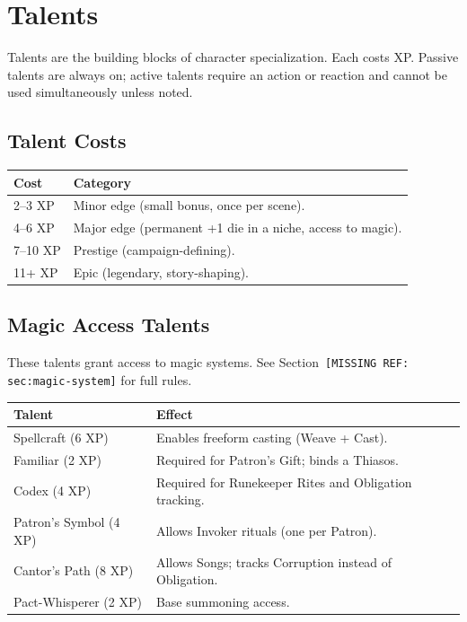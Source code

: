 
\section{Talents}

Talents are the building blocks of character specialization. Each costs XP. Passive talents are always on; active talents require an action or reaction and cannot be used simultaneously unless noted.

\subsection{Talent Costs}

\begin{tabular}{@{}ll@{}}
\toprule
\textbf{Cost} & \textbf{Category} \\
\midrule
2--3 XP & Minor edge (small bonus, once per scene). \\
4--6 XP & Major edge (permanent +1 die in a niche, access to magic). \\
7--10 XP & Prestige (campaign-defining). \\
11+ XP & Epic (legendary, story-shaping). \\
\bottomrule
\end{tabular}

\subsection{Magic Access Talents}

These talents grant access to magic systems. See Section~\texttt{[MISSING REF: sec:magic-system]} for full rules.

\begin{tabular}{@{}lp{10cm}@{}}
\toprule
\textbf{Talent} & \textbf{Effect} \\
\midrule
Spellcraft (6 XP) & Enables freeform casting (Weave + Cast). \\
Familiar (2 XP) & Required for Patron's Gift; binds a Thiasos. \\
Codex (4 XP) & Required for Runekeeper Rites and Obligation tracking. \\
Patron's Symbol (4 XP) & Allows Invoker rituals (one per Patron). \\
Cantor's Path (8 XP) & Allows Songs; tracks Corruption instead of Obligation. \\
Pact-Whisperer (2 XP) & Base summoning access. \\
\bottomrule
\end{tabular}

